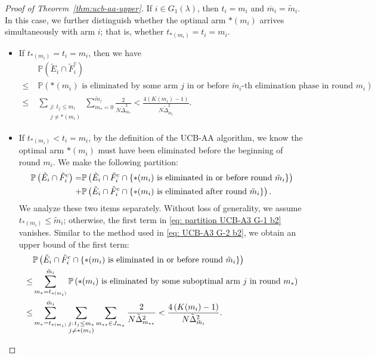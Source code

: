 \documentclass[
  12pt]{article}
\begin{document}
\begin{proof}[Proof of Theorem~\ref{thm:ucb-aa-upper}]
If $i\in G_1(\lambda)$, then $t_i=m_i$ and $\overline{m}_i=\tilde{m}_i$. In this case, we further distinguish whether the optimal arm $*(m_i)$ arrives simultaneously with arm $i$; that is, whether $t_{*(m_i)}=t_i=m_i$.
\begin{itemize}
    \item If $t_{*(m_i)}=t_i=m_i$, then we have
    \begin{align*}
        &\mathbb{P}\left(\tilde{E}_i\cap\tilde{F}_i^c\right)\\
        \!\!\!\!\!\!\!\!\!\leq \;&\mathbb{P}\left(*(m_i) \text{ is eliminated by some arm } j \text{ in or before $\tilde{m}_i$-th elimination phase in round } m_i\right) \\
        \leq \;& \sum_{\substack{j :\,t_j\leq m_i\\j\neq *(m_i)}}\sum_{m_{*}=0}^{\tilde{m}_i}\frac{2}{N \tilde{\Delta}_{m_{*}}^2}<\frac{4\left(K(m_i)-1\right)}{N\tilde{\Delta}_{\tilde{m}_i}^2}.
    \end{align*}
    \item If $t_{*(m_i)}<t_i=m_i$, by the definition of the UCB-AA algorithm, we know the optimal arm $*(m_i)$ must have been eliminated before the beginning of round $m_i$. We make the following partition:
\begin{align}
\mathbb{P}\left(\tilde{E}_i\cap\tilde{F}_i^c\right)=&\mathbb{P}\left(\tilde{E}_i\cap\tilde{F}_i^c\cap\{\text{$*(m_i)$ is eliminated in or before round }\tilde{m}_i\}\right)\notag\\
+&\mathbb{P}\left(\tilde{E}_i\cap\tilde{F}_i^c\cap\{\text{$*(m_i)$ is eliminated after round }\tilde{m}_i\}\right).
\label{eq: partition UCB-A3 G-1 b2}
\end{align}
We analyze these two items separately. Without loss of generality, we assume $t_{*(m_i)}\leq \tilde{m}_i$; otherwise, the first term in \eqref{eq: partition UCB-A3 G-1 b2} vanishes. Similar to the method used in \eqref{eq: UCB-A3 G-2 b2}, we obtain an upper bound of the first term:
\begin{align}
    &\mathbb{P}\left(\tilde{E}_i\cap\tilde{F}_i^c\cap\{\text{$*(m_i)$ is eliminated in or before round }\tilde{m}_i\}\right)\notag\\
\leq &\sum _{m_*=t_{*(m_i)}}^{\tilde{m}_i} \mathbb{P}\left(*(m_i) \text{ is eliminated by some suboptimal arm } j \text{ in round } m_*\right)\notag \\
\leq & \sum_{m_* = t_{*(m_i)}}^{\tilde{m}_i} \sum_{\substack{j :\,t_j\leq m_*\\j\neq *(m_i)}}\sum_{m_{**}\in J_{m_*}} \frac{2}{N \tilde{\Delta}_{m_{**}}^2}<\frac{4\left(K(m_i)-1\right)}{N\tilde{\Delta}_{\tilde{m}_i}^2}.

\end{align}
\end{itemize}
\end{proof}
\end{document}
